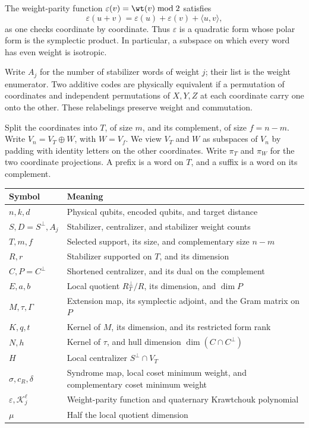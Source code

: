 The weight-parity function \(\varepsilon(v)=\wt(v)\bmod2\) satisfies
\begin{equation}\label{eq:polar}
 \varepsilon(u+v)=\varepsilon(u)+\varepsilon(v)+\langle u,v\rangle,
\end{equation}
as one checks coordinate by coordinate. Thus \(\varepsilon\) is a
quadratic form whose polar form is the symplectic product. In particular,
a subspace on which every word has even weight is isotropic.

Write \(A_j\) for the number of stabilizer words of weight \(j\); their
list is the weight enumerator. Two additive codes are physically equivalent
if a permutation of coordinates and independent permutations of
\(X,Y,Z\) at each coordinate carry one onto the other. These relabelings
preserve weight and commutation.

Split the coordinates into \(T\), of size \(m\), and its complement,
of size \(f=n-m\). Write \(V_n=V_T\oplus W\), with \(W=V_f\).
We view \(V_T\) and \(W\) as subspaces of \(V_n\) by padding with
identity letters on the other coordinates. Write \(\pi_T\) and
\(\pi_W\) for the two coordinate projections. A prefix is a word on
\(T\), and a suffix is a word on its complement.

\begin{center}\small
\begin{tabularx}{\linewidth}{@{}lX@{}}\toprule
Symbol&Meaning\\\midrule
\(n,k,d\)&Physical qubits, encoded qubits, and target distance\\
\(S,D=S^\perp,A_j\)&Stabilizer, centralizer, and stabilizer weight counts\\
\(T,m,f\)&Selected support, its size, and complementary size \(n-m\)\\
\(R,r\)&Stabilizer supported on \(T\), and its dimension\\
\(C,P=C^\perp\)&Shortened centralizer, and its dual on the complement\\
\(E,a,b\)&Local quotient \(R_T^\perp/R\), its dimension, and \(\dim P\)\\
\(M,\tau,\Gamma\)&Extension map, its symplectic adjoint, and the Gram matrix on \(P\)\\
\(K,q,t\)&Kernel of \(M\), its dimension, and its restricted form rank\\
\(N,h\)&Kernel of \(\tau\), and hull dimension \(\dim(C\cap C^\perp)\)\\
\(H\)&Local centralizer \(S^\perp\cap V_T\)\\
\(\sigma,c_R,\delta\)&Syndrome map, local coset minimum weight, and complementary coset minimum weight\\
\(\varepsilon,\mathcal{K}_j^\ell\)&Weight-parity function and quaternary Krawtchouk polynomial\\
\(\mu\)&Half the local quotient dimension\\\bottomrule
\end{tabularx}
\end{center}

